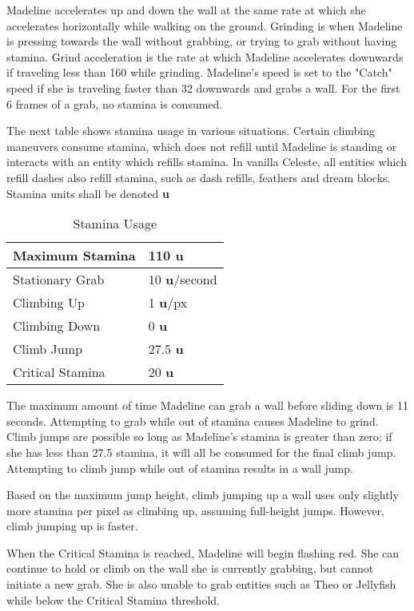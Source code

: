 \documentclass[oneside]{book}
\newcommand{\su}{\textbf{u}}
\begin{document}
Madeline accelerates up and down the wall at the same rate at which she accelerates horizontally while walking on the ground. Grinding is when Madeline is pressing towards the wall without grabbing, or trying to grab without having stamina. Grind acceleration is the rate at which Madeline accelerates downwards if traveling less than 160 while grinding. Madeline's speed is set to the "Catch" speed if she is traveling faster than 32 downwards and grabs a wall. For the first 6 frames of a grab, no stamina is consumed.

The next table shows stamina usage in various situations. Certain climbing maneuvers consume stamina, which does not refill until Madeline is standing or interacts with an entity which refills stamina. In vanilla Celeste, all entities which refill dashes also refill stamina, such as dash refills, feathers and dream blocks. Stamina units shall be denoted  \su

\begin{table}[h]
\begin{tabular}{|l|l|}
\hline
Maximum Stamina&110 \su\\
\hline
Stationary Grab&10 \su/second\\
\hline
Climbing Up&1 \su/px\\
\hline
Climbing Down&0 \su\\
\hline
Climb Jump&27.5 \su\\
\hline
Critical Stamina&20 \su\\
\hline
\end{tabular}
\caption{Stamina Usage}
\end{table}

The maximum amount of time Madeline can grab a wall before sliding down is 11 seconds. Attempting to grab while out of stamina causes Madeline to grind. Climb jumps are possible so long as Madeline's stamina is greater than zero; if she has less than 27.5 stamina, it will all be consumed for the final climb jump. Attempting to climb jump while out of stamina results in a wall jump.

Based on the maximum jump height, climb jumping up a wall uses only slightly more stamina per pixel as climbing up, assuming full-height jumps. However, climb jumping up is faster.

When the Critical Stamina is reached, Madeline will begin flashing red. She can continue to hold or climb on the wall she is currently grabbing, but cannot initiate a new grab. She is also unable to grab entities such as Theo or Jellyfish while below the Critical Stamina threshold.
\end{document}
